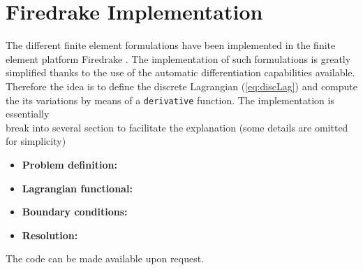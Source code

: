 \appendix
	
	\section{Firedrake Implementation}
	
	The different finite element formulations have been implemented in the
	finite element platform Firedrake \cite{firedrake}. The implementation
	of such formulations is greatly simplified thanks to the use of the
	automatic differentiation capabilities available.
	Therefore the idea is to define the discrete Lagrangian (\ref{eq:discLag})
	and compute the its variations by means of a \texttt{derivative}
	function. The implementation is essentially \\
	break into several section to facilitate the explanation
	(some details are omitted for simplicity)
	
	\begin{itemize}
	\item \textbf{Problem definition:}
	
	\item \textbf{Lagrangian functional:}
	
	\item \textbf{Boundary conditions:}
	
	\item \textbf{Resolution:}
	
	\end{itemize}	
	
	
	The code can be made available upon request.
	
	
